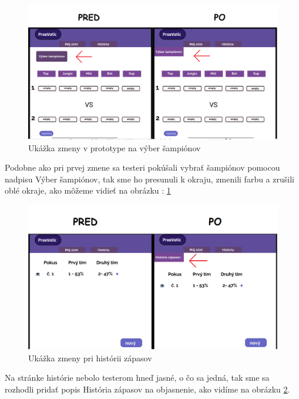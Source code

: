 \begin{figure}[h!]
	
	\includegraphics[width=.9\textwidth]{figures/2}
	
	\centering
	
	\caption{Ukážka zmeny v prototype na výber šampiónov\label{2}}
	
\end{figure}

Podobne ako pri prvej zmene sa testeri pokúšali vybrať šampiónov pomocou nadpisu Výber šampiónov, tak sme ho presunuli k okraju, zmenili farbu a zrušili oblé okraje, ako môžeme vidieť na obrázku : \ref{2} 

\begin{figure}[h!]
	
	\includegraphics[width=.9\textwidth]{figures/3}
	
	\centering
	
	\caption{ Ukážka zmeny pri histórii zápasov \label{3}}
	
\end{figure}

Na stránke histórie nebolo testerom hneď jasné, o čo sa jedná, tak sme sa rozhodli pridať popis História zápasov na objasnenie, ako vidíme na obrázku \ref{3}.
\\




